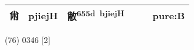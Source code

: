 \documentclass[14pt,a4paper]{scrartcl}
\begin{document}
\begin{longtable}[c]{@{}llllll@{}}
\begin{minipage}[t]{0.14\columnwidth}
㡀
\strut\end{minipage} &
\begin{minipage}[t]{0.14\columnwidth}\raggedright\strut
pjiejH
\strut\end{minipage} &
\begin{minipage}[t]{0.14\columnwidth}\raggedright\strut
敝\textsuperscript{655d~bjiejH}
\strut\end{minipage} &
\begin{minipage}[t]{0.14\columnwidth}\raggedright\strut
\strut\end{minipage} &
\begin{minipage}[t]{0.14\columnwidth}\raggedright\strut
\strut\end{minipage} &
\begin{minipage}[t]{0.14\columnwidth}\raggedright\strut
pure:B
\strut\end{minipage}\tabularnewline
\bottomrule
\end{longtable}

(76) 0346 {[}2{]}
\end{document}
